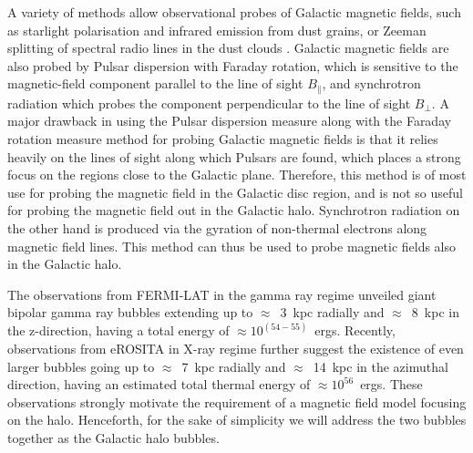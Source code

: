 \documentclass[usenatbib]{mnras}
\begin{document}
A variety of methods allow observational probes of Galactic magnetic fields, such as starlight polarisation and infrared emission from dust grains, or Zeeman splitting of spectral radio lines in the dust clouds \cite{Beck_2007}. Galactic magnetic fields are also probed by Pulsar dispersion with Faraday rotation, which is sensitive to the magnetic-field component parallel to the line of sight $B_{\parallel}$, and synchrotron radiation which probes the component perpendicular to the line of sight $B_{\perp}$. A major drawback in using the Pulsar dispersion measure along with the Faraday rotation measure method for probing Galactic magnetic fields is that it relies heavily on the lines of sight along which Pulsars are found, which places a strong focus on the regions close to the Galactic plane. Therefore, this method is of most use for probing the magnetic field in the Galactic disc region, and is not so useful for probing the magnetic field out in the Galactic halo. Synchrotron radiation on the other hand is produced via the gyration of non-thermal electrons along magnetic field lines. This method can thus be used to probe magnetic fields also in the Galactic halo.

The observations from FERMI-LAT \cite{Su_2010} in the gamma ray regime unveiled giant bipolar gamma ray bubbles extending up to $\approx$~3~kpc radially and $\approx$~8~kpc in the z-direction, having a total energy of $\approx 10^{(54-55)}$~ergs. Recently, observations from eROSITA \cite{eROSITA} in X-ray regime further suggest the existence of even larger bubbles going up to  $\approx$~7~kpc radially and $\approx$~14~kpc in the azimuthal direction, having an estimated total thermal energy of $\approx 10^{56}$~ergs. These observations strongly motivate the requirement of a magnetic field model focusing on the halo. Henceforth, for the sake of simplicity we will address the two bubbles together as the Galactic halo bubbles.
\end{document}
